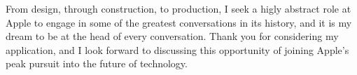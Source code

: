 \documentclass[11pt,a4paper,sans]{moderncv}        %
\begin{document}
From design, through construction, to production, I seek a higly abstract role at Apple to engage in some of the greatest conversations in its history, and it is my dream to be at the head of every conversation. Thank you for considering my application, and I look forward to discussing this opportunity of joining Apple's peak pursuit into the future of technology.


\makeletterclosing
\end{document}

